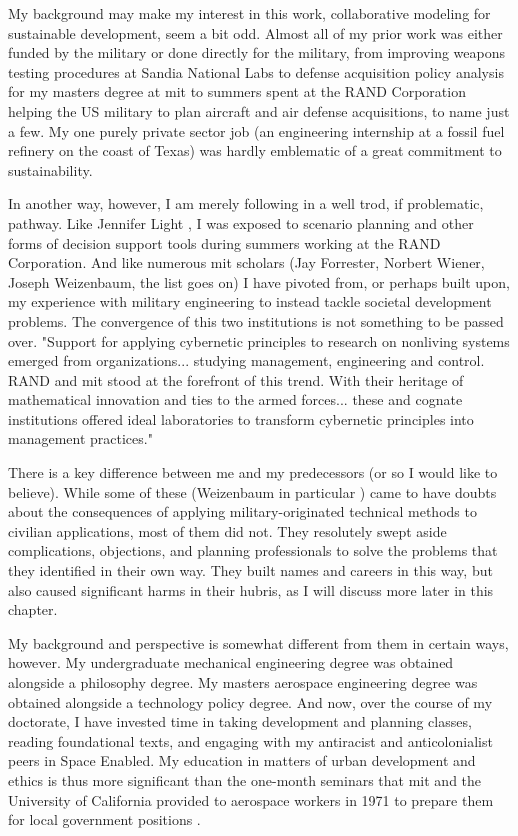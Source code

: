 My background may make my interest in this work, collaborative modeling for sustainable development, seem a bit odd. Almost all of my prior work was either funded by the military or done directly for the military, from improving weapons testing procedures at Sandia National Labs to defense acquisition policy analysis for my masters degree at \ac{mit} to summers spent at the RAND Corporation helping the US military to plan aircraft and air defense acquisitions, to name just a few. My one purely private sector job (an engineering internship at a fossil fuel refinery on the coast of Texas) was hardly emblematic of a great commitment to sustainability.

In another way, however, I am merely following in a well trod, if problematic, pathway. Like Jennifer Light \cite{lightWarfareWelfareDefense2005}, I was exposed to scenario planning and other forms of decision support tools during summers working at the RAND Corporation. And like numerous \ac{mit} scholars (Jay Forrester, Norbert Wiener, Joseph Weizenbaum, the list goes on) I have pivoted from, or perhaps built upon, my experience with military engineering to instead tackle societal development problems. The convergence of this two institutions is not something to be passed over. "Support for applying cybernetic principles to research on nonliving systems emerged from organizations... studying management, engineering and control. RAND and \ac{mit} stood at the forefront of this trend. With their heritage of mathematical innovation and ties to the armed forces... these and cognate institutions offered ideal laboratories to transform cybernetic principles into management practices." \cite{lightWarfareWelfareDefense2005} 

There is a key difference between me and my predecessors (or so I would like to believe). While some of these  (Weizenbaum in particular \cite{lightWarfareWelfareDefense2005}) came to have doubts about the consequences of applying military-originated technical methods to civilian applications, most of them did not. They resolutely swept aside complications, objections, and planning professionals to solve the problems that they identified in their own way. They built names and careers in this way, but also caused significant harms in their hubris, as I will discuss more later in this chapter.

My background and perspective is somewhat different from them in certain ways, however. My undergraduate mechanical engineering degree was obtained alongside a philosophy degree. My masters aerospace engineering degree was obtained alongside a technology policy degree. And now, over the course of my doctorate, I have invested time in taking development and planning classes, reading foundational texts, and engaging with my antiracist and anticolonialist peers in Space Enabled. My education in matters of urban development and ethics is thus more significant than the one-month seminars that \ac{mit} and the University of California provided to aerospace workers in 1971 to prepare them for local government positions \cite{lightWarfareWelfareDefense2005}. 


